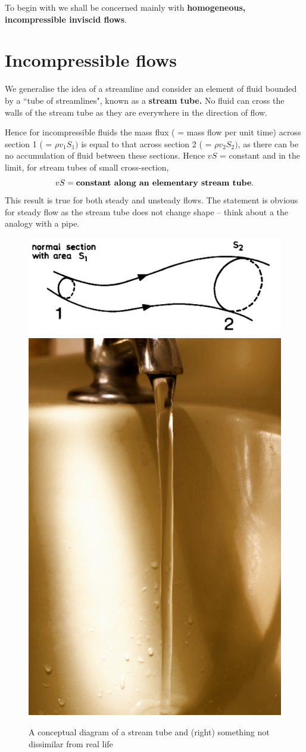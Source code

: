 \documentclass[10pt]{report}
\begin{document}
To begin with we shall be concerned mainly with \textbf{homogeneous,
incompressible inviscid flows}.



\section{Incompressible flows}

We generalise the idea of a streamline and consider an element of fluid
bounded by a ``tube of streamlines", known as a \textbf{stream tube.} No
fluid can cross the walls of the stream tube as they are everywhere in the
direction of flow.


Hence for incompressible fluids the mass flux ( = mass flow per unit time)
across section 1 ( = $\rho v_{1}S_{1})$ is equal to that across section
2 ( = $\rho v_{2}S_{2})$, as there can be no accumulation of fluid
between these sections. Hence $vS$ = constant and in the limit, for stream
tubes of small cross-section,
\[
vS = \hbox{\textbf{constant along an elementary stream tube}.}
\]
This result is true for both steady and unsteady flows. The statement is
obvious for steady flow as the stream tube does not change shape -- think
about a the analogy with a pipe.

\begin{figure}[htbp]
\centerline{\includegraphics[width=0.5\linewidth]{Section6.pdf} \hspace{4ex}
            \includegraphics[width=0.2\linewidth]{DSC_4302a.jpg}}
\caption{ A conceptual diagram of a stream tube and (right)
          something not dissimilar from real life  }
\label{fig1.6}
\end{figure}
\end{document}

